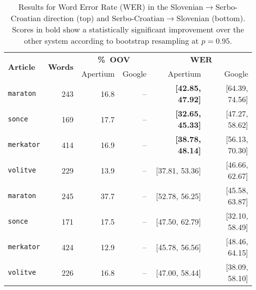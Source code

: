 

\begin{table*}
\begin{center}
\begin{tabular}{|l|r|rr||rr|}
   \hline
  \multirow{2}{*}{\textbf{Article}}  & \multirow{2}{*}{\textbf{Words}} & \multicolumn{2}{|c||}{\textbf{\%~OOV}} & \multicolumn{2}{c|}{\textbf{WER}}\\\cline{3-6}
                    &                & Apertium & Google &  Apertium & Google \\
   \hline
   \hline
  \texttt{maraton}  & 243            & 16.8     & --     & \textbf{[42.85, 47.92]} & [64.39, 74.56] \\
  \texttt{sonce}    & 169            & 17.7     & --     & \textbf{[32.65, 45.33]}    & [47.27, 58.62] \\
  \texttt{merkator} & 414            & 16.9     & --     & \textbf{[38.78, 48.14]}     & [56.13, 70.30] \\
  \texttt{volitve}  & 229            & 13.9     & --     & [37.81, 53.36]      & [46.66, 62.67] \\
  \hline
  \hline
  \texttt{maraton}  & 245            & 37.7     & --     & [52.78, 56.25]           & [45.58, 63.87]\\
  \texttt{sonce}    & 171            & 17.5     & --     & [47.50, 62.79]    & [32.10, 58.49] \\
  \texttt{merkator} & 424            & 12.9     & --     & [45.78, 56.56]    & [48.46, 64.15] \\
  \texttt{volitve}  & 226            & 16.8     & --     & [47.00, 58.44]    & [38.09, 58.10]\\

  \hline
\end{tabular}
 \caption{Results for Word Error Rate (WER) in the Slovenian$\rightarrow$Serbo-Croatian direction (top) and Serbo-Croatian$\rightarrow$Slovenian (bottom). Scores in bold show a statistically significant improvement over the other system according to bootstrap resampling at $p = 0.95$.}
\label{table:quantitative1}
\end{center}
\end{table*}


